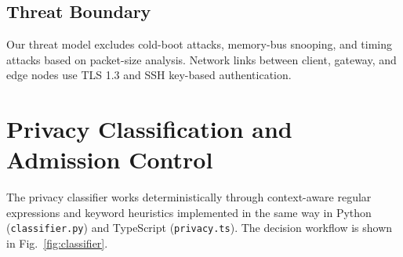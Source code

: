 \documentclass[conference]{IEEEtran}
\begin{document}
\subsection{Threat Boundary}
Our threat model excludes cold-boot attacks, memory-bus snooping, and timing attacks based on packet-size analysis.
Network links between client, gateway, and edge nodes use TLS 1.3 and SSH key-based authentication.

\section{Privacy Classification and Admission Control}

The privacy classifier works deterministically through context-aware regular expressions and keyword heuristics implemented in the same way in Python (\texttt{classifier.py}) and TypeScript (\texttt{privacy.ts}).
The decision workflow is shown in Fig.~\ref{fig:classifier}.
\end{document}
